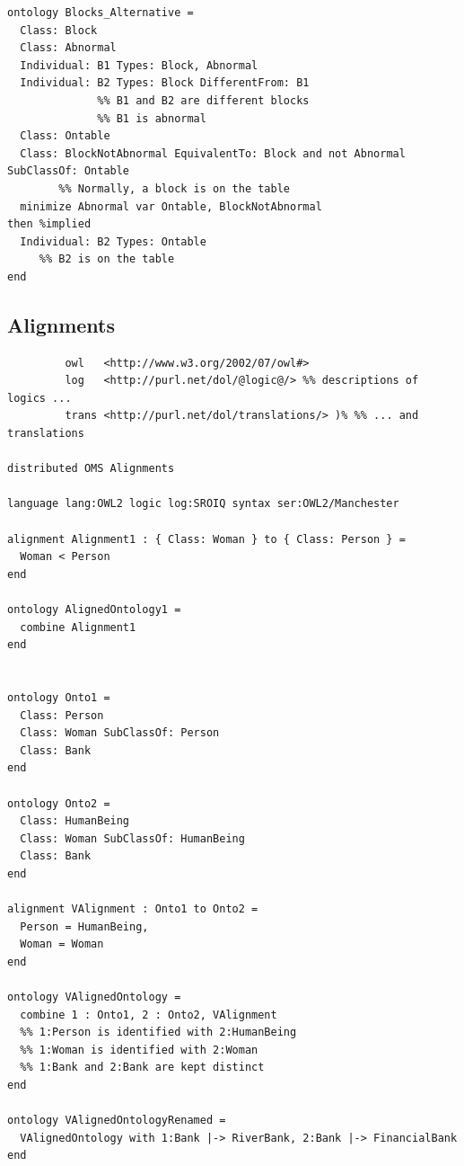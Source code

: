 \documentclass[10pt,%
\ifpretendfinal
final%
\else
draft%
\fi,
]{scrreprt}
\newcommand{\ssclause}[1]{\subsection{#1}}
\begin{document}
 
  \begin{lstlisting}[language=dolText,morekeywords={forall,if,not,circ,var,Class,Individual,EquivalentTo,and,SubClassOf}]
ontology Blocks_Alternative =
  Class: Block
  Class: Abnormal
  Individual: B1 Types: Block, Abnormal
  Individual: B2 Types: Block DifferentFrom: B1
              %% B1 and B2 are different blocks
              %% B1 is abnormal
  Class: Ontable 
  Class: BlockNotAbnormal EquivalentTo: Block and not Abnormal SubClassOf: Ontable 
        %% Normally, a block is on the table
  minimize Abnormal var Ontable, BlockNotAbnormal
then %implied
  Individual: B2 Types: Ontable
     %% B2 is on the table
end
  \end{lstlisting}

\ssclause{Alignments}

\begin{lstlisting}[basicstyle=\ttfamily,language=dolText,morekeywords={props,ObjectProperty,Class,DisjointUnionOf,SubClassOf,Characteristics,Transitive,Asymmetric,SubPropertyOf,DisjointClasses,EquivalentTo,inverse,only,forall,iff,if,or,exists,bridge,distributed},escapechar=@,mathescape]
%prefix( :     <http://www.example.org/alignment#>
         owl   <http://www.w3.org/2002/07/owl#>
         log   <http://purl.net/dol/@logic@/> %% descriptions of logics ...
         trans <http://purl.net/dol/translations/> )% %% ... and translations

distributed OMS Alignments

language lang:OWL2 logic log:SROIQ syntax ser:OWL2/Manchester

alignment Alignment1 : { Class: Woman } to { Class: Person } =
  Woman < Person
end

ontology AlignedOntology1 =
  combine Alignment1
end


ontology Onto1 =
  Class: Person
  Class: Woman SubClassOf: Person
  Class: Bank
end

ontology Onto2 =
  Class: HumanBeing
  Class: Woman SubClassOf: HumanBeing
  Class: Bank
end

alignment VAlignment : Onto1 to Onto2 =
  Person = HumanBeing,
  Woman = Woman
end

ontology VAlignedOntology =
  combine 1 : Onto1, 2 : Onto2, VAlignment
  %% 1:Person is identified with 2:HumanBeing
  %% 1:Woman is identified with 2:Woman
  %% 1:Bank and 2:Bank are kept distinct
end

ontology VAlignedOntologyRenamed =
  VAlignedOntology with 1:Bank |-> RiverBank, 2:Bank |-> FinancialBank
end

\end{lstlisting}
\end{document}
